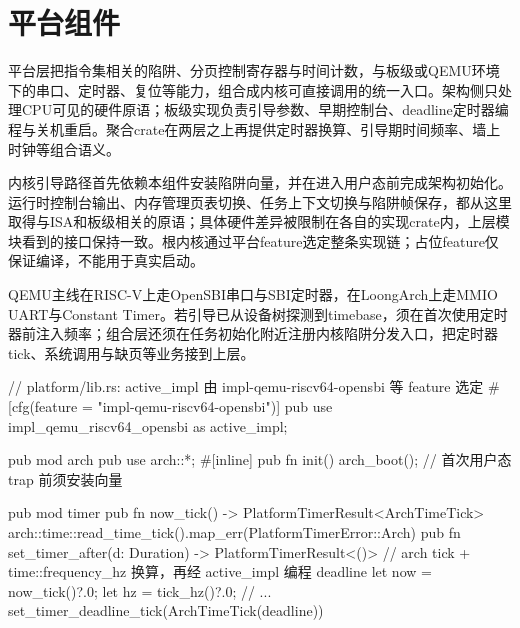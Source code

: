 
\section{平台组件}

平台层把指令集相关的陷阱、分页控制寄存器与时间计数，与板级或QEMU环境下的串口、定时器、复位等能力，组合成内核可直接调用的统一入口。架构侧只处理CPU可见的硬件原语；板级实现负责引导参数、早期控制台、deadline定时器编程与关机重启。聚合crate在两层之上再提供定时器换算、引导期时间频率、墙上时钟等组合语义。

内核引导路径首先依赖本组件安装陷阱向量，并在进入用户态前完成架构初始化。运行时控制台输出、内存管理页表切换、任务上下文切换与陷阱帧保存，都从这里取得与ISA和板级相关的原语；具体硬件差异被限制在各自的实现crate内，上层模块看到的接口保持一致。根内核通过平台feature选定整条实现链；占位feature仅保证编译，不能用于真实启动。

QEMU主线在RISC-V上走OpenSBI串口与SBI定时器，在LoongArch上走MMIO UART与Constant Timer。若引导已从设备树探测到timebase，须在首次使用定时器前注入频率；组合层还须在任务初始化附近注册内核陷阱分发入口，把定时器tick、系统调用与缺页等业务接到上层。

\begin{rustcode}
// platform/lib.rs: active_impl 由 impl-qemu-riscv64-opensbi 等 feature 选定
#[cfg(feature = "impl-qemu-riscv64-opensbi")]
pub use impl_qemu_riscv64_opensbi as active_impl;

pub mod arch {
    pub use arch::*;
    #[inline]
    pub fn init() {
        arch_boot(); // 首次用户态 trap 前须安装向量
    }
}

pub mod timer {
    pub fn now_tick() -> PlatformTimerResult<ArchTimeTick> {
        arch::time::read_time_tick().map_err(PlatformTimerError::Arch)
    }
    pub fn set_timer_after(d: Duration) -> PlatformTimerResult<()> {
        // arch tick + time::frequency_hz 换算，再经 active_impl 编程 deadline
        let now = now_tick()?.0;
        let hz = tick_hz()?.0;
        // ...
        set_timer_deadline_tick(ArchTimeTick(deadline))
    }
}
\end{rustcode}

